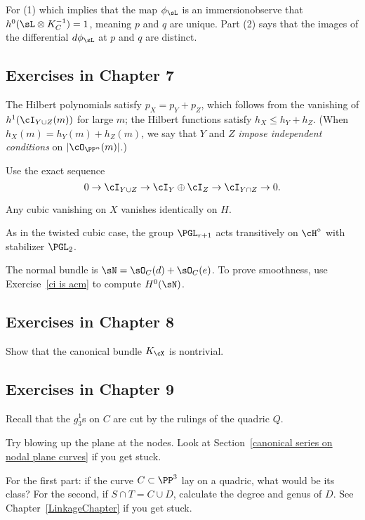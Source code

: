 For (1) \emdash which implies that the map $\phi_\sL$ is an
immersion\emdash observe that $h^0(\sL\otimes K_C^{-1}) = 1$, meaning
$p$ and $q$ are unique. Part (2) says that the images of the
differential $d\phi_\sL$ at $p$ and $q$ are distinct.

\subsection*{Exercises in Chapter 7}

The Hilbert polynomials satisfy $p_X = p_Y + p_Z$, which follows
from the vanishing of $h^1(\cI_{Y\cup Z} (m))$ for large $m$; the
Hilbert functions satisfy $h_X \leq h_Y + h_Z$. (When $h_X(m) = h_Y(m)
+ h_Z(m)$, we say that $Y$ and $Z$
\emph{impose independent conditions}
%
on $|\cO_{\PP^n}(m)|$.)

Use the exact sequence
$$
0 \to \cI_{Y\cup Z} \to \cI_{Y} \oplus \cI_{Z} \to \cI_{Y \cap Z} \to 0.
$$

Any cubic vanishing on $X$ vanishes identically on $H$.

As in the twisted cubic case, the group $\PGL_{r+1}$
%
acts transitively on $\cH^\circ$ with stabilizer $\PGL_2$.

The normal bundle is $\sN = \sO_C(d)+\sO_C(e)$. To prove smoothness, use
Exercise~\ref{ci is acm} to compute $H^0(\sN)$.

\subsection*{Exercises in Chapter 8}

 Show that the canonical bundle $K_\cX$ is nontrivial.

\subsection*{Exercises in Chapter 9}

Recall that the $g^1_3$s on $C$ are cut by the rulings of the quadric $Q$.

Try blowing up
%
the plane at the nodes. Look at
Section~\ref{canonical series on nodal plane curves} if you get stuck.

For the first part: if the curve $C \subset \PP^3$ lay on a quadric,
what would be its class? For the second, if
$S \cap T = C \cup D$, calculate the degree and genus of $D$.
See Chapter~\ref{LinkageChapter} if you get stuck.


